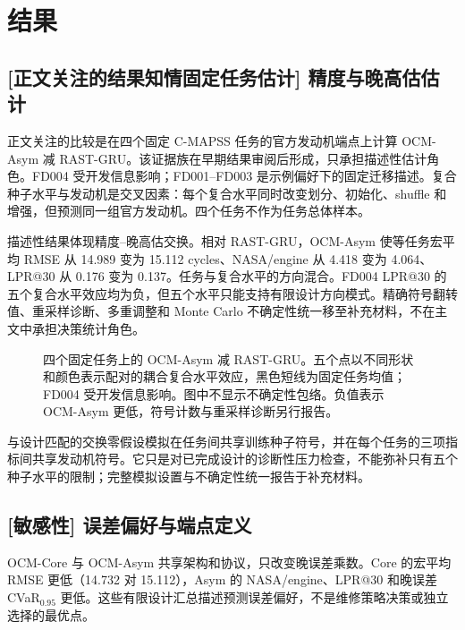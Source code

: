 
\FloatBarrier
\section{结果}

\subsection{[正文关注的结果知情固定任务估计] 精度与晚高估估计}

正文关注的比较是在四个固定 C-MAPSS 任务的官方发动机端点上计算 OCM-Asym 减 RAST-GRU。该证据族在早期结果审阅后形成，只承担描述性估计角色。FD004 受开发信息影响；FD001--FD003 是示例偏好下的固定迁移描述。复合种子水平与发动机是交叉因素：每个复合水平同时改变划分、初始化、shuffle 和增强，但预测同一组官方发动机。四个任务不作为任务总体样本。

描述性结果体现精度--晚高估交换。相对 RAST-GRU，OCM-Asym 使等任务宏平均 RMSE 从 14.989 变为 15.112 cycles、NASA/engine 从 4.418 变为 4.064、LPR@30 从 0.176 变为 0.137。任务与复合水平的方向混合。FD004 LPR@30 的五个复合水平效应均为负，但五个水平只能支持有限设计方向模式。精确符号翻转值、重采样诊断、多重调整和 Monte Carlo 不确定性统一移至补充材料，不在主文中承担决策统计角色。

\begin{figure}[!t]
\centering
{}
\caption{四个固定任务上的 OCM-Asym 减 RAST-GRU。五个点以不同形状和颜色表示配对的耦合复合水平效应，黑色短线为固定任务均值；FD004 受开发信息影响。图中不显示不确定性包络。负值表示 OCM-Asym 更低，符号计数与重采样诊断另行报告。}
\label{fig:primary-fixed-diagnostic-zh}
\end{figure}

与设计匹配的交换零假设模拟在任务间共享训练种子符号，并在每个任务的三项指标间共享发动机符号。它只是对已完成设计的诊断性压力检查，不能弥补只有五个种子水平的限制；完整模拟设置与不确定性统一报告于补充材料。
\FloatBarrier

\subsection{[敏感性] 误差偏好与端点定义}

OCM-Core 与 OCM-Asym 共享架构和协议，只改变晚误差乘数。Core 的宏平均 RMSE 更低（14.732 对 15.112），Asym 的 NASA/engine、LPR@30 和晚误差 CVaR$_{0.95}$ 更低。这些有限设计汇总描述预测误差偏好，不是维修策略决策或独立选择的最优点。

